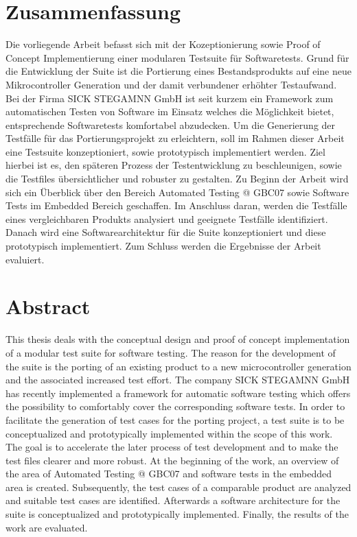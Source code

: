 \onehalfspacing
\section*{Zusammenfassung}
Die vorliegende Arbeit befasst sich mit der Kozeptionierung sowie Proof of Concept Implementierung einer modularen Testsuite für Softwaretests. Grund für die Entwicklung der Suite ist die Portierung eines Bestandsprodukts auf eine neue Mikrocontroller Generation und der damit verbundener erhöhter Testaufwand. Bei der Firma SICK STEGAMNN GmbH ist seit kurzem ein Framework zum automatischen Testen von Software im Einsatz welches die Möglichkeit bietet, entsprechende Softwaretests komfortabel abzudecken. Um die Generierung der Testfälle für das Portierungsprojekt zu erleichtern, soll im Rahmen dieser Arbeit eine Testsuite konzeptioniert, sowie prototypisch implementiert werden. Ziel hierbei ist es, den späteren Prozess der Testentwicklung zu beschleunigen, sowie die Testfiles übersichtlicher und robuster zu gestalten. Zu Beginn der Arbeit wird sich ein Überblick über den Bereich Automated Testing @ GBC07 sowie Software Tests im Embedded Bereich geschaffen. Im Anschluss daran, werden die Testfälle eines vergleichbaren Produkts analysiert und geeignete Testfälle identifiziert. Danach wird eine Softwarearchitektur für die Suite konzeptioniert und diese prototypisch implementiert. Zum Schluss werden die Ergebnisse der Arbeit evaluiert.
\newpage
\section*{Abstract}
This thesis deals with the conceptual design and proof of concept implementation of a modular test suite for software testing. The reason for the development of the suite is the porting of an existing product to a new microcontroller generation and the associated increased test effort. The company SICK STEGAMNN GmbH has recently implemented a framework for automatic software testing which offers the possibility to comfortably cover the corresponding software tests. In order to facilitate the generation of test cases for the porting project, a test suite is to be conceptualized and prototypically implemented within the scope of this work. The goal is to accelerate the later process of test development and to make the test files clearer and more robust. At the beginning of the work, an overview of the area of Automated Testing @ GBC07 and software tests in the embedded area is created. Subsequently, the test cases of a comparable product are analyzed and suitable test cases are identified. Afterwards a software architecture for the suite is conceptualized and prototypically implemented. Finally, the results of the work are evaluated.

